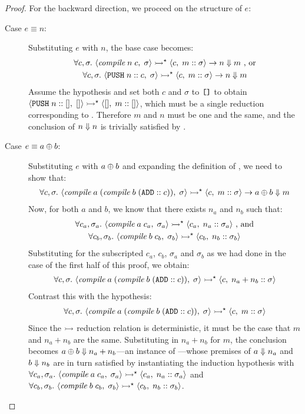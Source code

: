\begin{proof}
For the backward direction, we proceed on the structure of $e$:
\begin{description}
\item[Case $e \equiv n$:]%
Substituting $e$ with $n$, the base case becomes:
\begin{gather*}
	\forall c, \sigma.\
		\MS<\compile\;n\;c, \sigma>
			\ExecS \MS<c, m :: \sigma>
	\rightarrow n \Eval m
	\textrm{ , or} \\
	\forall c, \sigma.\
		\MS<\PUSH n :: c, \sigma>
			\ExecS \MS<c, m :: \sigma>
	\rightarrow n \Eval m
\end{gather*}
Assume the hypothesis and set both $c$ and $\sigma$ to $\texttt{[]}$ to obtain
$\MS<\PUSH n :: [], []> \ExecS \MS<[], m :: []>$, which must be a single
reduction corresponding to \eqName{vm-push}. Therefore $m$ and $n$ must be
one and the same, and the conclusion of $n \Downarrow n$ is trivially satisfied
by \eqName{big-val}.
\item[Case $e \equiv a \oplus b$:]%
Substituting $e$ with $a \oplus b$ and expanding the definition of \compile,
we need to show that:
\begin{gather*}
	\forall c, \sigma.\
		\MS<\compile\;a\;(\compile\;b\;(\ADD :: c)), \sigma>
			\ExecS \MS<c, m :: \sigma>
	\rightarrow a \Add b \Eval m
\end{gather*}
Now, for both $a$ and $b$, we know that there exists $n_a$ and $n_b$ such
that:
\begin{gather*}
	\forall c_a, \sigma_a.\ \MS<\compile\;a\;c_a, \sigma_a>
		\ExecS \MS<c_a, n_a :: \sigma_a>
	\textrm{ , and} \\
	\forall c_b, \sigma_b.\ \MS<\compile\;b\;c_b, \sigma_b>
		\ExecS \MS<c_b, n_b :: \sigma_b>
\end{gather*}
Substituting for the subscripted $c_a$, $c_b$, $\sigma_a$ and $\sigma_b$ as
we had done in the  case of the first half of this proof,
we obtain:
\begin{gather*}
	\forall c, \sigma.\
		\MS<\compile\;a\;(\compile\;b\;(\ADD :: c)), \sigma>
			\ExecS \MS<c, n_a + n_b :: \sigma>
\end{gather*}
Contrast this with the hypothesis:
\begin{gather*}
	\forall c, \sigma.\
		\MS<\compile\;a\;(\compile\;b\;(\ADD :: c)), \sigma>
			\ExecS \MS<c, m :: \sigma>
\end{gather*}
Since the $\rightarrowtail$ reduction relation is deterministic, it must be the case
that $m$ and $n_a + n_b$ are the same. Substituting in $n_a + n_b$ for $m$,
the conclusion becomes $a \oplus b \Downarrow n_a + n_b$---an instance of
\eqName{big-plus}---whose premises of $a \Downarrow n_a$ and $b \Downarrow n_b$ are in
turn satisfied by instantiating the induction hypothesis with $\forall c_a,
\sigma_a.\ \MS<\compile\;a\;c_a, \sigma_a> \ExecS \MS<c_a, n_a :: \sigma_a>$
and $\forall c_b, \sigma_b.\ \MS<\compile\;b\;c_b, \sigma_b> \ExecS \MS<c_b,
n_b :: \sigma_b>$.


\end{description}
\end{proof}
